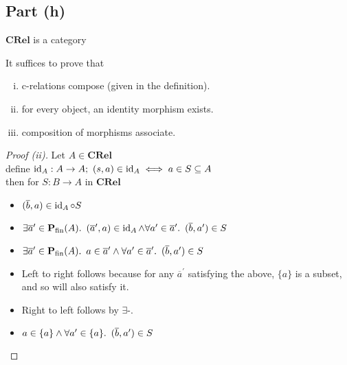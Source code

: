 \subsection{Part (h)}\label{sec:q-2-h}

\begin{prop}
  $\mathbf{CRel}$ is a category

  It suffices to prove that
  \begin{enumerate}[(i)]
    \item c-relations compose (given in the definition).

    \item for every object, an identity morphism exists.

    \item composition of morphisms associate.
  \end{enumerate}
  \begin{proof}[Proof (ii)]
    Let $A\in\mathbf{CRel}$\\[1em]
    \noindent define $\operatorname{id}_A : A\to A;~(s, a)\in \operatorname{id}_A \iff a\in S\subseteq A$\\[1em]
    \noindent then for $S : B\to A$ in $\mathbf{CRel}$

    \begin{itemize}
      \item[\phantom{\imps}]
        $(\overline{b}, a)\in \operatorname{id}_A\circ S$

      \item[\iffs]
        $\exists\overline{a}^\prime\in\mathbf{P}_{\operatorname{fin}}(A)\ldotp~(\overline{a}^\prime,a)\in\operatorname{id}_A\land \forall a^\prime\in\overline{a}^\prime\ldotp~(\overline{b},a^\prime)\in S$

      \item[\iffs]
        $\exists\overline{a}^\prime\in\mathbf{P}_{\operatorname{fin}}(A)\ldotp~a\in\overline{a}^\prime\land \forall a^\prime\in\overline{a}^\prime\ldotp~(\overline{b},a^\prime)\in S$

      \item[\phantom{\imps}]
        Left to right follows because for any $\overline{a}^\prime$ satisfying the above, $\{a\}$ is a subset, and so will also satisfy it.

      \item[\phantom{\imps}]
        Right to left follows by $\exists$-\Intro.

      \item[\iffs]
        $a\in\{a\}\land\forall a^\prime\in\{a\}\ldotp~(\overline{b},a^\prime)\in S$


\end{itemize}
\end{proof}
\end{prop}
